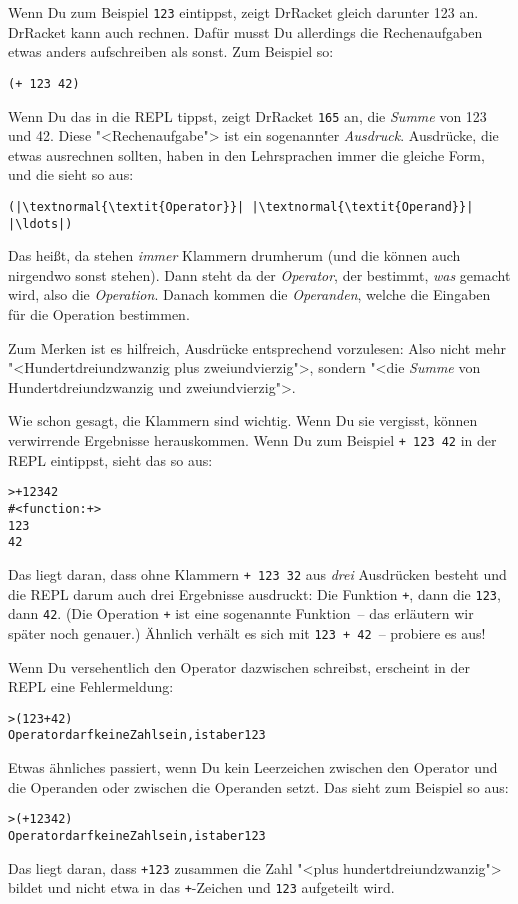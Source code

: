 Wenn Du zum Beispiel \lstinline{123} eintippst, zeigt DrRacket gleich
darunter 123 an.  DrRacket kann auch rechnen.  Dafür musst Du
allerdings die Rechenaufgaben etwas anders aufschreiben als sonst.
Zum Beispiel so:
%
\begin{lstlisting}
(+ 123 42)
\end{lstlisting}
%
Wenn Du das in die REPL tippst, zeigt DrRacket \lstinline{165} an, die
\textit{Summe} von 123 und 42.  Diese "<Rechenaufgabe">
ist ein sogenannter \textit{Ausdruck}.  Ausdrücke, die
etwas ausrechnen sollten, haben in den Lehrsprachen immer die gleiche
Form, und die sieht so aus:
%
\begin{lstlisting}
(|\textnormal{\textit{Operator}}| |\textnormal{\textit{Operand}}| |\ldots|)
\end{lstlisting}
%
Das heißt, da stehen \emph{immer} Klammern drumherum
(und die können auch nirgendwo sonst stehen).  Dann steht da der
\textit{Operator}, der bestimmt, \emph{was} gemacht
wird, also die \textit{Operation}.  Danach kommen die
\textit{Operanden}, welche die Eingaben
für die Operation bestimmen.

Zum Merken ist es hilfreich, Ausdrücke entsprechend vorzulesen: Also
nicht mehr "<Hundertdreiundzwanzig plus zweiundvierzig">, sondern
"<die \emph{Summe} von Hundertdreiundzwanzig und zweiundvierzig">.

Wie schon gesagt, die Klammern sind wichtig.  Wenn Du sie vergisst,
können verwirrende Ergebnisse herauskommen.  Wenn Du zum Beispiel
\lstinline{+ 123 42} in der REPL eintippst, sieht das so aus:
%
\begin{alltt}
> + {\color{green}123 42}
{\color{blue}#<function:+>
123
42}
\end{alltt}
%
Das liegt daran, dass ohne Klammern \lstinline{+ 123 32} aus \emph{drei}
Ausdrücken besteht und die REPL darum auch drei Ergebnisse ausdruckt:
Die Funktion \lstinline{+}, dann die \lstinline{123}, dann \lstinline{42}.
(Die Operation \lstinline{+} ist eine sogenannte Funktion~-- das
erläutern wir später noch genauer.)  Ähnlich verhält es sich mit
\lstinline{123 + 42}~-- probiere es aus!

Wenn Du versehentlich den Operator dazwischen schreibst, erscheint
in der REPL eine Fehlermeldung:
%
\begin{alltt}
> ({\color{green}123} + {\color{green}42})
{\color{red}Operator darf keine Zahl sein, ist aber 123}
\end{alltt}
%
Etwas ähnliches passiert, wenn Du kein Leerzeichen zwischen den
Operator und die Operanden oder zwischen die Operanden setzt.  Das
sieht zum Beispiel so aus:
%
\begin{alltt}
> ({\color{green}+123} {\color{green}42})
{\color{red}Operator darf keine Zahl sein, ist aber 123}
\end{alltt}
%
Das liegt daran, dass \lstinline{+123} zusammen die Zahl "<plus
hundertdreiundzwanzig"> bildet und nicht etwa in das \lstinline{+}-Zeichen und
\lstinline{123} aufgeteilt wird.

